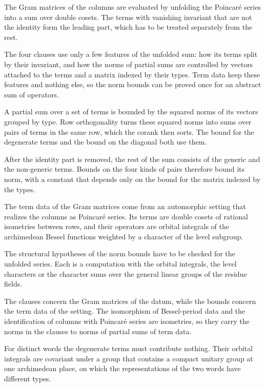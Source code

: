 The Gram matrices of the columns are evaluated by unfolding the Poincaré series into a sum over
double cosets. The terms with vanishing invariant that are not the identity form the leading part,
which has to be treated separately from the rest.

The four clauses use only a few features of the unfolded sum: how its terms split by their
invariant, and how the norms of partial sums are controlled by vectors attached to the terms and a
matrix indexed by their types. Term data keep these features and nothing else, so the norm bounds can
be proved once for an abstract sum of operators.

A partial sum over a set of terms is bounded by the squared norms of its vectors grouped by type.
Row orthogonality turns these squared norms into sums over pairs of terms in the same row, which the
corank then sorts. The bound for the degenerate terms and the bound on the diagonal both use them.

After the identity part is removed, the rest of the sum consists of the generic and the non-generic
terms. Bounds on the four kinds of pairs therefore bound its norm, with a constant that depends only
on the bound for the matrix indexed by the types.

The term data of the Gram matrices come from an automorphic setting that realizes the columns as
Poincaré series. Its terms are double cosets of rational isometries between rows, and their operators
are orbital integrals of the archimedean Bessel functions weighted by a character of the level
subgroup.

The structural hypotheses of the norm bounds have to be checked for the unfolded series. Each is a
computation with the orbital integrals, the level characters or the character sums over the general
linear groups of the residue fields.

The clauses concern the Gram matrices of the datum, while the bounds concern the term data of the
setting. The isomorphism of Bessel-period data and the identification of columns with Poincaré series
are isometries, so they carry the norms in the clauses to norms of partial sums of term data.

For distinct words the degenerate terms must contribute nothing. Their orbital integrals are covariant
under a group that contains a compact unitary group at one archimedean place, on which the
representations of the two words have different types.

